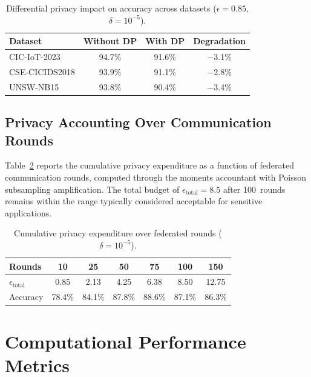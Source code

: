 \begin{table}[htbp]
\centering
\caption{Differential privacy impact on accuracy across datasets ($\epsilon=0.85$, $\delta=10^{-5}$).}
\label{tab:app_dp_datasets}
\begin{tabular}{lccc}
\toprule
Dataset & Without DP & With DP & Degradation \\
\midrule
CIC-IoT-2023   & 94.7\% & 91.6\% & $-$3.1\% \\
CSE-CICIDS2018 & 93.9\% & 91.1\% & $-$2.8\% \\
UNSW-NB15      & 93.8\% & 90.4\% & $-$3.4\% \\
\bottomrule
\end{tabular}
\end{table}


\subsection{Privacy Accounting Over Communication Rounds}
\label{app:privacy_accounting}

Table~\ref{tab:app_privacy_rounds} reports the cumulative privacy expenditure as a function of federated communication rounds, computed through the moments accountant with Poisson subsampling amplification. The total budget of $\epsilon_{\mathrm{total}}=8.5$ after 100~rounds remains within the range typically considered acceptable for sensitive applications.

\begin{table}[htbp]
\centering
\caption{Cumulative privacy expenditure over federated rounds ($\delta=10^{-5}$).}
\label{tab:app_privacy_rounds}
\begin{tabular}{lcccccc}
\toprule
Rounds & 10 & 25 & 50 & 75 & 100 & 150 \\
\midrule
$\epsilon_{\mathrm{total}}$ & 0.85 & 2.13 & 4.25 & 6.38 & 8.50 & 12.75 \\
Accuracy & 78.4\% & 84.1\% & 87.8\% & 88.6\% & 87.1\% & 86.3\% \\
\bottomrule
\end{tabular}
\end{table}


\section{Computational Performance Metrics}
\label{app:comp_perf}

